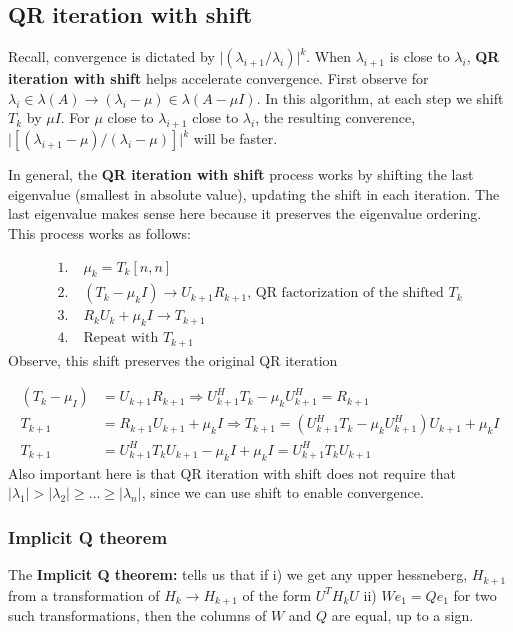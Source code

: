 \documentclass{article}
\newcommand{\abs}[1]{\lvert#1\rvert}
\begin{document}
\subsection{QR iteration with shift}
Recall, convergence is dictated by $\abs{(\lambda_{i+1} / \lambda_i)}^k$. When $\lambda_{i+1}$ is close to $\lambda_i$, \textbf{QR iteration with shift} helps accelerate convergence. First observe for $\lambda_i \in \lambda(A) \rightarrow (\lambda_i - \mu) \in \lambda(A - \mu I)$. In this algorithm, at each step we shift $T_k$ by $\mu I$. For $\mu$ close to $\lambda_{i+1}$ close to $\lambda_i$, the resulting converence, $\abs{[(\lambda_{i+1} - \mu) / (\lambda_i - \mu)]}^k$ will be faster.

In general, the \textbf{QR iteration with shift} process works by shifting the last eigenvalue (smallest in absolute value), updating the shift in each iteration. The last eigenvalue makes sense here because it preserves the eigenvalue ordering. This process works as follows:

\begin{align*}
    1. \;& \mu_k = T_k[n, n]\\
    2. \;& (T_k - \mu_k I) \longrightarrow U_{k+1}R_{k+1} \textrm{, QR factorization of the shifted } T_k\\
    3. \;& R_kU_k + \mu_k I \longrightarrow T_{k+1}\\
    4. \;& \textrm{Repeat with } T_{k+1}
\end{align*}
Observe, this shift preserves the original QR iteration

\begin{align*}
    (T_k - \mu_ I) &= U_{k+1}R_{k+1} \Longrightarrow U_{k+1}^HT_k - \mu_k U_{k+1}^H = R_{k+1}\\
    T_{k+1} &= R_{k+1}U_{k+1} + \mu_k I \Longrightarrow T_{k+1} = (U_{k+1}^HT_k - \mu_k U_{k+1}^H)U_{k+1} + \mu_k I\\
    T_{k+1} &= U_{k+1}^HT_kU_{k+1} - \mu_k I + \mu_k I = U_{k+1}^HT_kU_{k+1}
\end{align*}
Also important here is that QR iteration with shift does not require that $\abs{\lambda_1} > \abs{\lambda_2} \geq \dots \geq \abs{\lambda_n}$, since we can use shift to enable convergence.


\subsubsection{Implicit Q theorem}
The \textbf{Implicit Q theorem:} tells us that if i) we get any upper hessneberg, $H_{k+1}$ from a transformation of $H_k \rightarrow H_{k+1}$ of the form $U^TH_kU$ ii) $We_1 = Qe_1$ for two such transformations, then the columns of $W$ and $Q$ are equal, up to a sign.
\end{document}

